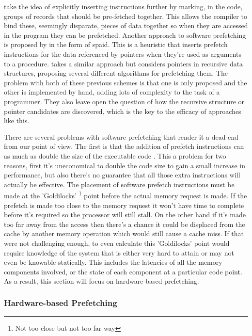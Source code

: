 \citet{zhangSpeedingIrregularApplications1995} take the idea of explicitly inserting instructions further by marking, in the code, groups of records that should be pre-fetched together. This allows the compiler to bind these, seemingly disparate, pieces of data together so when they are accessed in the program they can be prefetched. Another approach to software prefetching is proposed by \citet{lipastiSPAIDSoftwarePrefetching1995} in the form of \gls{spaid}. This is a heuristic that inserts prefetch instructions for the data referenced by pointers when they're used as arguments to a procedure. \citet{lukCompilerbasedPrefetchingRecursive1996} takes a similar approach but considers pointers in recursive data structures, proposing several different algorithms for prefetching them. The problem with both of these previous schemes is that one is only proposed and the other is implemented by hand, adding lots of complexity to the task of a programmer. They also leave open the question of how the recursive structure or pointer candidates are discovered, which is the key to the efficacy of approaches like this.

There are several problems with software prefetching that render it a dead-end from our point of view. The first is that the addition of prefetch instructions can as much as double the size of the executable code \cite{leeWhenPrefetchingWorks2012}. This a problem for two reasons, first it's uneconomical to double the code size to gain a small increase in performance, but also there's no guarantee that all those extra instructions will actually be effective. The placement of software prefetch instructions must be made at the 'Goldilocks' \footnote{Not too close but not too far way} point before the actual memory request is made. If the prefetch is made too close to the memory request it won't have time to complete before it's required so the processor will still stall. On the other hand if it's made too far away from the access then there's a chance it could be displaced from the cache by another memory operation which would still cause a cache miss. If that were not challenging enough, to even calculate this 'Goldilocks' point would require knowledge of the system that is either very hard to attain or may not even be knowable statically. This includes the latencies of all the memory components involved, or the state of each component at a particular code point. As a result, this section will focus on hardware-based prefetching.

\subsubsection{Hardware-based Prefetching}

